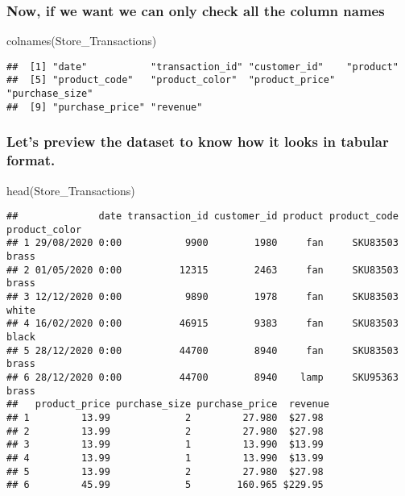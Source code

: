 \documentclass[
]{article}
\newenvironment{Shaded}{\begin{snugshade}}{\end{snugshade}}
\newcommand{\FunctionTok}[1]{\textcolor[rgb]{0.00,0.00,0.00}{#1}}
\newcommand{\NormalTok}[1]{#1}
\begin{document}
\hypertarget{now-if-we-want-we-can-only-check-all-the-column-names}{%
\subsubsection{Now, if we want we can only check all the column
names}\label{now-if-we-want-we-can-only-check-all-the-column-names}}

\begin{Shaded}
\begin{Highlighting}[]
\FunctionTok{colnames}\NormalTok{(Store\_Transactions)}
\end{Highlighting}
\end{Shaded}

\begin{verbatim}
##  [1] "date"           "transaction_id" "customer_id"    "product"       
##  [5] "product_code"   "product_color"  "product_price"  "purchase_size" 
##  [9] "purchase_price" "revenue"
\end{verbatim}

\hypertarget{lets-preview-the-dataset-to-know-how-it-looks-in-tabular-format.}{%
\subsubsection{Let's preview the dataset to know how it looks in tabular
format.}\label{lets-preview-the-dataset-to-know-how-it-looks-in-tabular-format.}}

\begin{Shaded}
\begin{Highlighting}[]
\FunctionTok{head}\NormalTok{(Store\_Transactions)}
\end{Highlighting}
\end{Shaded}

\begin{verbatim}
##              date transaction_id customer_id product product_code product_color
## 1 29/08/2020 0:00           9900        1980     fan     SKU83503         brass
## 2 01/05/2020 0:00          12315        2463     fan     SKU83503         brass
## 3 12/12/2020 0:00           9890        1978     fan     SKU83503         white
## 4 16/02/2020 0:00          46915        9383     fan     SKU83503         black
## 5 28/12/2020 0:00          44700        8940     fan     SKU83503         brass
## 6 28/12/2020 0:00          44700        8940    lamp     SKU95363         brass
##   product_price purchase_size purchase_price  revenue
## 1         13.99             2         27.980  $27.98 
## 2         13.99             2         27.980  $27.98 
## 3         13.99             1         13.990  $13.99 
## 4         13.99             1         13.990  $13.99 
## 5         13.99             2         27.980  $27.98 
## 6         45.99             5        160.965 $229.95
\end{verbatim}
\end{document}

